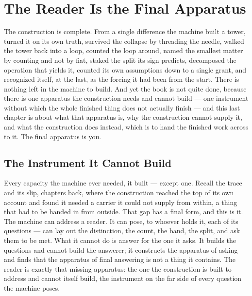\chapter{The Reader Is the Final Apparatus}

The construction is complete. From a single difference the machine built a tower, turned it on its own truth,
survived the collapse by threading the needle, walked the tower back into a loop, counted the loop around, named
the smallest matter by counting and not by fiat, staked the split its sign predicts, decomposed the operation that
yields it, counted its own assumptions down to a single grant, and recognized itself, at the last, as the forcing
it had been from the start. There is nothing left in the machine to build. And yet the book is not quite done,
because there is one apparatus the construction needs and cannot build --- one instrument without which the whole
finished thing does not actually finish --- and this last chapter is about what that apparatus is, why the
construction cannot supply it, and what the construction does instead, which is to hand the finished work across
to it. The final apparatus is you.

\section{The Instrument It Cannot Build}

Every capacity the machine ever needed, it built --- except one. Recall the trace and its slip, chapters back,
where the construction reached the top of its own account and found it needed a carrier it could not supply from
within, a thing that had to be handed in from outside. That gap has a final form, and this is it. The machine can
address a reader. It can pose, to whoever holds it, each of its questions --- can lay out the distinction, the
count, the band, the split, and ask them to be met. What it cannot do is answer for the one it asks. It builds the
questions and cannot build the answerer; it constructs the apparatus of asking and finds that the apparatus of
final answering is not a thing it contains. The reader is exactly that missing apparatus: the one the construction
is built to address and cannot itself build, the instrument on the far side of every question the machine poses.

